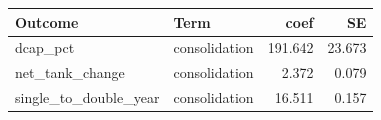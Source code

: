 \begin{center}\small\renewcommand{\arraystretch}{1.2}
\begin{tabular}{llrr}
\toprule
\textbf{Outcome} & \textbf{Term} & \textbf{coef} & \textbf{SE} \\
\midrule
dcap\_pct & consolidation & 191.642 & 23.673 \\
net\_tank\_change & consolidation & 2.372 & 0.079 \\
single\_to\_double\_year & consolidation & 16.511 & 0.157 \\
\bottomrule
\end{tabular}
\end{center}
